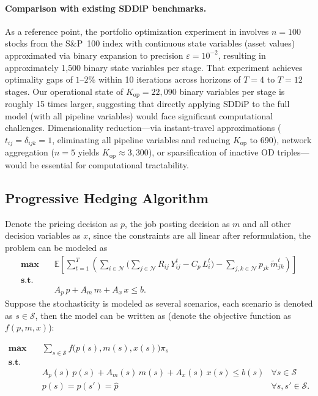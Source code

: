 \documentclass[trsc,nonblindrev]{informs3noheader}
\begin{document}
\paragraph{Comparison with existing SDDiP benchmarks.}
As a reference point, the portfolio optimization experiment in \citep{zou2019stochastic} involves $n=100$ stocks from the S\&P~100 index with continuous state variables (asset values) approximated via binary expansion to precision $\varepsilon=10^{-2}$, resulting in approximately 1{,}500 binary state variables per stage. That experiment achieves optimality gaps of $1$--$2\%$ within 10 iterations across horizons of $T=4$ to $T=12$ stages. Our operational state of $K_{\mathrm{op}}=22{,}090$ binary variables per stage is roughly 15 times larger, suggesting that directly applying SDDiP to the full model (with all pipeline variables) would face significant computational challenges. Dimensionality reduction---via instant-travel approximations ($t_{ij}=\delta_{ijk}=1$, eliminating all pipeline variables and reducing $K_{\mathrm{op}}$ to 690), network aggregation ($n=5$ yields $K_{\mathrm{op}}\approx 3{,}300$), or sparsification of inactive OD triples---would be essential for computational tractability.




\subsection{Progressive Hedging Algorithm\citep{gade2016obtaining}}

Denote the pricing decision as $p$, the job posting decision as $m$ and all other decision variables as $x$, since the constraints are all linear after reformulation, the problem can be modeled as
\begin{align}
    \mathbf{\max} \quad
    &\mathbb{E}\left[
    \sum_{t=1}^{T}
    \left(
    \sum_{i\in \mathcal{N}} \big( \sum_{j\in \mathcal{N}}R_{ij}\, Y_{ij}^t - C_p\, L_{i}^t \big)
    - \sum_{j,k\in \mathcal{N}} p_{jk}\, \tilde{m}_{jk}^t
    \right)
    \right]\\[4pt]
    \textbf{s.t.}\nonumber\\
    & A_p\,p + A_m\, m + A_x\,x \le b.
\end{align}
Suppose the stochasticity is modeled as several scenarios, each scenario is denoted as $s\in \mathcal{S}$, then the model can be written as (denote the objective function as $f(p,m,x)$):

\begin{align}
    \mathbf{\max} \quad
    &\sum_{s\in \mathcal{S}}
    f\big(p(s),m(s),x(s)\big)\pi_s\\[4pt]
    \textbf{s.t.}\nonumber\\
    & A_p(s)\,p(s) + A_m(s)\, m(s) + A_x(s)\,x(s) \le b(s) \label{constraints} & \forall s\in \mathcal{S}\\
    &p(s)=p(s')=\hat{p} & \forall s,s'\in \mathcal{S}.\label{non-anticipativity constraint}
\end{align}
\end{document}

